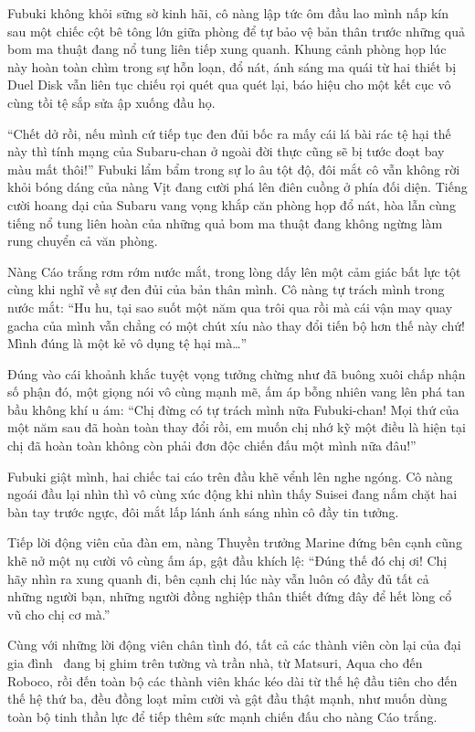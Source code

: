 \documentclass[../main.tex]{subfiles}
\begin{document}
Fubuki không khỏi sững sờ kinh hãi, cô nàng lập tức ôm đầu lao mình nấp kín sau một chiếc cột bê tông lớn giữa phòng để tự bảo vệ bản thân trước những quả bom ma thuật đang nổ tung liên tiếp xung quanh. Khung cảnh phòng họp lúc này hoàn toàn chìm trong sự hỗn loạn, đổ nát, ánh sáng ma quái từ hai thiết bị Duel Disk vẫn liên tục chiếu rọi quét qua quét lại, báo hiệu cho một kết cục vô cùng tồi tệ sắp sửa ập xuống đầu họ.

``Chết dở rồi, nếu mình cứ tiếp tục đen đủi bốc ra mấy cái lá bài rác tệ hại thế này thì tính mạng của Subaru-chan ở ngoài đời thực cũng sẽ bị tước đoạt bay màu mất thôi!'' Fubuki lẩm bẩm trong sự lo âu tột độ, đôi mắt cô vẫn không rời khỏi bóng dáng của nàng Vịt đang cười phá lên điên cuồng ở phía đối diện. Tiếng cười hoang dại của Subaru vang vọng khắp căn phòng họp đổ nát, hòa lẫn cùng tiếng nổ tung liên hoàn của những quả bom ma thuật đang không ngừng làm rung chuyển cả văn phòng.

Nàng Cáo trắng rơm rớm nước mắt, trong lòng dấy lên một cảm giác bất lực tột cùng khi nghĩ về sự đen đủi của bản thân mình. Cô nàng tự trách mình trong nước mắt: ``Hu hu, tại sao suốt một năm qua trôi qua rồi mà cái vận may quay gacha của mình vẫn chẳng có một chút xíu nào thay đổi tiến bộ hơn thế này chứ! Mình đúng là một kẻ vô dụng tệ hại mà\dots''

Đúng vào cái khoảnh khắc tuyệt vọng tưởng chừng như đã buông xuôi chấp nhận số phận đó, một giọng nói vô cùng mạnh mẽ, ấm áp bỗng nhiên vang lên phá tan bầu không khí u ám: ``Chị đừng có tự trách mình nữa Fubuki-chan! Mọi thứ của một năm sau đã hoàn toàn thay đổi rồi, em muốn chị nhớ kỹ một điều là hiện tại chị đã hoàn toàn không còn phải đơn độc chiến đấu một mình nữa đâu!''

Fubuki giật mình, hai chiếc tai cáo trên đầu khẽ vểnh lên nghe ngóng. Cô nàng ngoái đầu lại nhìn thì vô cùng xúc động khi nhìn thấy Suisei đang nắm chặt hai bàn tay trước ngực, đôi mắt lấp lánh ánh sáng nhìn cô đầy tin tưởng.

Tiếp lời động viên của đàn em, nàng Thuyền trưởng Marine đứng bên cạnh cũng khẽ nở một nụ cười vô cùng ấm áp, gật đầu khích lệ: ``Đúng thế đó chị ơi! Chị hãy nhìn ra xung quanh đi, bên cạnh chị lúc này vẫn luôn có đầy đủ tất cả những người bạn, những người đồng nghiệp thân thiết đứng đây để hết lòng cổ vũ cho chị cơ mà.''

Cùng với những lời động viên chân tình đó, tất cả các thành viên còn lại của đại gia đình \hll\ đang bị ghim trên tường và trần nhà, từ Matsuri, Aqua cho đến Roboco, rồi đến toàn bộ các thành viên khác kéo dài từ thế hệ đầu tiên cho đến thế hệ thứ ba, đều đồng loạt mỉm cười và gật đầu thật mạnh, như muốn dùng toàn bộ tinh thần lực để tiếp thêm sức mạnh chiến đấu cho nàng Cáo trắng.
\end{document}
